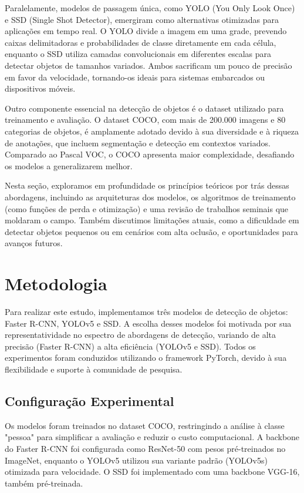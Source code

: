 \documentclass[a4paper,12pt]{article}
\begin{document}
	Paralelamente, modelos de passagem única, como YOLO (You Only Look Once) e SSD (Single Shot Detector), emergiram como alternativas otimizadas para aplicações em tempo real. O YOLO divide a imagem em uma grade, prevendo caixas delimitadoras e probabilidades de classe diretamente em cada célula, enquanto o SSD utiliza camadas convolucionais em diferentes escalas para detectar objetos de tamanhos variados. Ambos sacrificam um pouco de precisão em favor da velocidade, tornando-os ideais para sistemas embarcados ou dispositivos móveis.
	
	Outro componente essencial na detecção de objetos é o dataset utilizado para treinamento e avaliação. O dataset COCO, com mais de 200.000 imagens e 80 categorias de objetos, é amplamente adotado devido à sua diversidade e à riqueza de anotações, que incluem segmentação e detecção em contextos variados. Comparado ao Pascal VOC, o COCO apresenta maior complexidade, desafiando os modelos a generalizarem melhor.
	
	Nesta seção, exploramos em profundidade os princípios teóricos por trás dessas abordagens, incluindo as arquiteturas dos modelos, os algoritmos de treinamento (como funções de perda e otimização) e uma revisão de trabalhos seminais que moldaram o campo. Também discutimos limitações atuais, como a dificuldade em detectar objetos pequenos ou em cenários com alta oclusão, e oportunidades para avanços futuros.
	
	\section{Metodologia}
	Para realizar este estudo, implementamos três modelos de detecção de objetos: Faster R-CNN, YOLOv5 e SSD. A escolha desses modelos foi motivada por sua representatividade no espectro de abordagens de detecção, variando de alta precisão (Faster R-CNN) a alta eficiência (YOLOv5 e SSD). Todos os experimentos foram conduzidos utilizando o framework PyTorch, devido à sua flexibilidade e suporte à comunidade de pesquisa.
	
	\subsection{Configuração Experimental}
	Os modelos foram treinados no dataset COCO, restringindo a análise à classe "pessoa" para simplificar a avaliação e reduzir o custo computacional. A backbone do Faster R-CNN foi configurada como ResNet-50 com pesos pré-treinados no ImageNet, enquanto o YOLOv5 utilizou sua variante padrão (YOLOv5s) otimizada para velocidade. O SSD foi implementado com uma backbone VGG-16, também pré-treinada.
	
\end{document}
